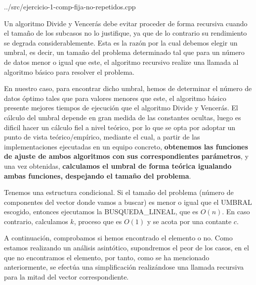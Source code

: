 




{../src/ejercicio-1-comp-fija-no-repetidos.cpp} 


Un algoritmo Divide y Vencerás debe evitar proceder de forma recursiva cuando el tamaño de los subcasos no lo justifique, ya que
de lo contrario su rendimiento se degrada considerablemente. Esta es la razón por la cual debemos elegir un umbral, es decir, 
un tamaño del problema determinado tal que para un número de datos menor o igual que este, el algoritmo recursivo realize una 
llamada al algoritmo básico para resolver el problema. 

En nuestro caso, para encontrar dicho umbral, hemos de determinar el número de datos óptimo tales que para valores menores que este, 
el algoritmo básico presente mejores tiempos de ejecución que el algoritmo Divide y Vencerás. El cálculo del umbral depende en gran 
medida de las constantes ocultas, luego es dificil hacer un cálculo fiel a nivel teórico, por lo que se opta por adoptar un punto de 
vista teórico/empírico, mediante el cual, a partir de las implementaciones ejecutadas en un equipo concreto, \textbf{obtenemos las 
funciones de ajuste de ambos algoritmos con sus correspondientes parámetros}, y una vez obtenidas, \textbf{calculamos el umbral de 
forma teórica igualando ambas funciones, despejando el tamaño del problema}. 




Tenemos una estructura condicional. Si el tamaño del problema (número de componentes del vector donde 
vamos a buscar) es menor o igual que el UMBRAL escogido, entonces ejecutamos la BUSQUEDA\_LINEAL, que es $O(n)$. 
En caso contrario, calculamos $k$, proceso que es $O(1)$ y se acota por una contante $c$. 

A continuación, comprobamos si hemos encontrado el elemento o no. Como estamos realizando un análisis asintótico, supondremos
el peor de los casos, en el que no encontramos el elemento, por tanto, como se ha mencionado anteriormente,
se efectúa una simplificación realizándose una llamada recursiva para la mitad del vector correspondiente.

